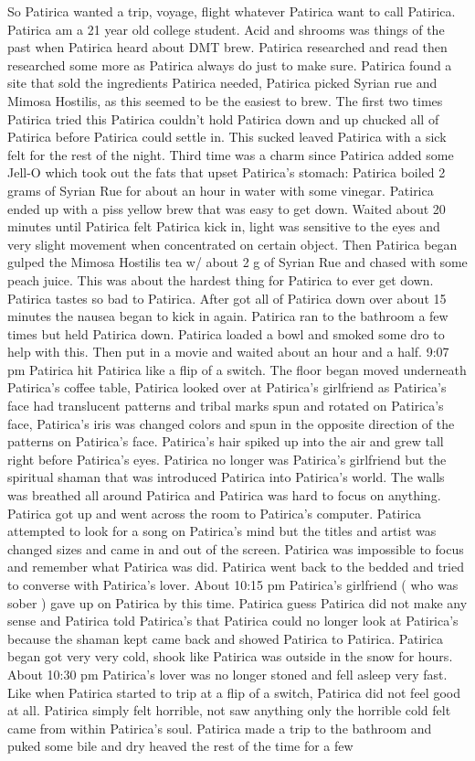 \documentclass[12pt]{book}
\begin{document}
So Patirica wanted a trip, voyage, flight whatever Patirica want to call Patirica. Patirica am a 21 year old college student. Acid and shrooms was things of the past when Patirica heard about DMT brew. Patirica researched and read then researched some more as Patirica always do just to make sure. Patirica found a site that sold the ingredients Patirica needed, Patirica picked Syrian rue and Mimosa Hostilis, as this seemed to be the easiest to brew. The first two times Patirica tried this Patirica couldn't hold Patirica down and up chucked all of Patirica before Patirica could settle in. This sucked leaved Patirica with a sick felt for the rest of the night. Third time was a charm since Patirica added some Jell-O which took out the fats that upset Patirica's stomach: Patirica boiled 2 grams of Syrian Rue for about an hour in water with some vinegar. Patirica ended up with a piss yellow brew that was easy to get down. Waited about 20 minutes until Patirica felt Patirica kick in, light was sensitive to the eyes and very slight movement when concentrated on certain object. Then Patirica began gulped the Mimosa Hostilis tea w/ about 2 g of Syrian Rue and chased with some peach juice. This was about the hardest thing for Patirica to ever get down. Patirica tastes so bad to Patirica. After got all of Patirica down over about 15 minutes the nausea began to kick in again. Patirica ran to the bathroom a few times but held Patirica down. Patirica loaded a bowl and smoked some dro to help with this. Then put in a movie and waited about an hour and a half. 9:07 pm Patirica hit Patirica like a flip of a switch. The floor began moved underneath Patirica's coffee table, Patirica looked over at Patirica's girlfriend as Patirica's face had translucent patterns and tribal marks spun and rotated on Patirica's face, Patirica's iris was changed colors and spun in the opposite direction of the patterns on Patirica's face. Patirica's hair spiked up into the air and grew tall right before Patirica's eyes. Patirica no longer was Patirica's girlfriend but the spiritual shaman that was introduced Patirica into Patirica's world. The walls was breathed all around Patirica and Patirica was hard to focus on anything. Patirica got up and went across the room to Patirica's computer. Patirica attempted to look for a song on Patirica's mind but the titles and artist was changed sizes and came in and out of the screen. Patirica was impossible to focus and remember what Patirica was did. Patirica went back to the bedded and tried to converse with Patirica's lover. About 10:15 pm Patirica's girlfriend ( who was sober ) gave up on Patirica by this time. Patirica guess Patirica did not make any sense and Patirica told Patirica's that Patirica could no longer look at Patirica's because the shaman kept came back and showed Patirica to Patirica. Patirica began got very very cold, shook like Patirica was outside in the snow for hours. About 10:30 pm Patirica's lover was no longer stoned and fell asleep very fast. Like when Patirica started to trip at a flip of a switch, Patirica did not feel good at all. Patirica simply felt horrible, not saw anything only the horrible cold felt came from within Patirica's soul. Patirica made a trip to the bathroom and puked some bile and dry heaved the rest of the time for a few 
\end{document}
